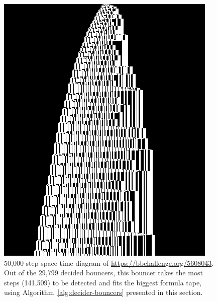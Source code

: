 \begin{figure}[h!]
    \centering
    \includegraphics[scale=0.35]{figures/bouncers/5608043.png}
    \caption{\small 50,000-step space-time diagram of \url{https://bbchallenge.org/5608043}. Out of the 29,799 decided bouncers, this bouncer takes the most steps (141,509) to be detected and fits the biggest formula tape, using Algorithm~\ref{alg:decider-bouncers} presented in this section.}\label{fig:big-bounce}
\end{figure}
\vspace{-2.5ex}
